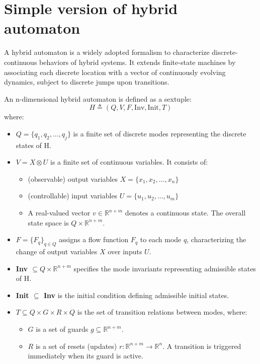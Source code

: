 \documentclass{article}
\begin{document}
\section*{Simple version of hybrid automaton}
A hybrid automaton is a widely adopted formalism to characterize discrete-continuous behaviors of hybrid systems. It extends finite-state machines by associating each discrete location with a vector of continuously evolving dynamics, subject to discrete jumps upon transitions.

An n-dimensional hybrid automaton is defined as a sextuple:
$$ H \triangleq (Q, V, F, \text{Inv}, \text{Init}, T) $$
where:
\begin{itemize}
    \item \textbf{$Q = \{q_1, q_2, \dots, q_j\}$} is a finite set of discrete modes representing the discrete states of H.
    
    \item \textbf{$V = X \otimes U$} is a finite set of continuous variables. It consists of:
    \begin{itemize}
        \item (observable) output variables \textbf{$X = \{x_1, x_2, \dots, x_n\}$}
        \item (controllable) input variables \textbf{$U = \{u_1, u_2, \dots, u_m\}$}
        \item A real-valued vector $v \in \mathbb{R}^{n+m}$ denotes a continuous state. The overall state space is $Q \times \mathbb{R}^{n+m}$.
    \end{itemize}
    
    \item \textbf{$F = \{F_q\}_{q \in Q}$} assigns a flow function $F_q$ to each mode $q$, characterizing the change of output variables $X$ over inputs $U$.
    
    \item \textbf{Inv $\subseteq Q \times \mathbb{R}^{n+m}$} specifies the mode invariants representing admissible states of H.
    
    \item \textbf{Init $\subseteq$ Inv} is the initial condition defining admissible initial states.
    
    \item \textbf{$T \subseteq Q \times G \times R \times Q$} is the set of transition relations between modes, where:
    \begin{itemize}
        \item \textbf{$G$} is a set of guards $g \subseteq \mathbb{R}^{n+m}$.
        \item \textbf{$R$} is a set of resets (updates) $r: \mathbb{R}^{n+m} \to \mathbb{R}^n$. A transition is triggered immediately when its guard is active.
    \end{itemize}
\end{itemize}
\end{document}
